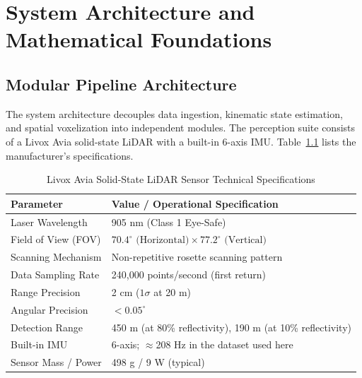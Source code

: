 \documentclass[11pt,a4paper]{report}
\begin{document}
\newpage

\chapter{System Architecture and Mathematical Foundations}

\section{Modular Pipeline Architecture}
The system architecture decouples data ingestion, kinematic state estimation, and spatial voxelization into independent modules. The perception suite consists of a Livox Avia solid-state LiDAR with a built-in 6-axis IMU. Table~\ref{tab:sensor_spec} lists the manufacturer's specifications.

\begin{table}[H]
    \centering
    \caption{Livox Avia Solid-State LiDAR Sensor Technical Specifications}
    \label{tab:sensor_spec}
    \vspace{2mm}
    \begin{tabular}{ll}
        \toprule
        \textbf{Parameter} & \textbf{Value / Operational Specification} \\
        \midrule
        Laser Wavelength & 905 nm (Class 1 Eye-Safe) \\
        Field of View (FOV) & $70.4^\circ \text{ (Horizontal)} \times 77.2^\circ \text{ (Vertical)}$ \\
        Scanning Mechanism & Non-repetitive rosette scanning pattern \\
        Data Sampling Rate & 240,000 points/second (first return) \\
        Range Precision & 2 cm ($1\sigma$ at 20 m) \\
        Angular Precision & $< 0.05^\circ$ \\
        Detection Range & 450 m (at 80\% reflectivity), 190 m (at 10\% reflectivity) \\
        Built-in IMU & 6-axis; $\approx$208 Hz in the dataset used here \\
        Sensor Mass / Power & 498 g / 9 W (typical) \\
        \bottomrule
    \end{tabular}
\end{table}
\end{document}
